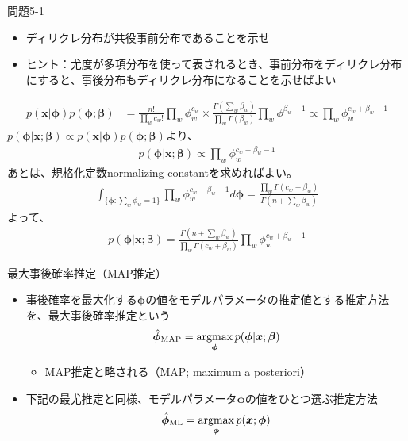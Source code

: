 \documentclass[aspectratio=169,unicode,dvipdfmx,14pt]{beamer}
\begin{document}
\begin{frame}{問題5-1}
\large
\begin{itemize}
\item ディリクレ分布が共役事前分布であることを示せ
\item ヒント：尤度が多項分布を使って表されるとき、事前分布をディリクレ分布にすると、事後分布もディリクレ分布になることを示せばよい
\end{itemize}
\end{frame}

\begin{frame}
\FontMath
\begin{align}
p(\bm{x}|\bm{\phi})p(\bm{\phi};\bm{\beta})
& =
\frac{n!}{\prod_w c_w!} \prod_w \phi_w^{c_w} \times \frac{\Gamma(\sum_w \beta_w)}{\prod_w \Gamma(\beta_w)}\prod_w \phi^{\beta_w - 1}
\propto
\prod_w \phi_w^{c_w + \beta_w - 1}
\end{align}
$p(\bm{\phi}|\bm{x};\bm{\beta}) \propto p(\bm{x}|\bm{\phi})p(\bm{\phi};\bm{\beta})$より、
\begin{align}
p(\bm{\phi} | \bm{x}; \bm{\beta}) \propto \prod_w \phi_w^{c_w + \beta_w - 1}
\end{align}
あとは、規格化定数normalizing constantを求めればよい。
\begin{align}
\int_{\{ \bm{\phi}: \sum_w \phi_w = 1 \}} \prod_w \phi_w^{c_w + \beta_w - 1} d\bm{\phi} 
= \frac{\prod_w \Gamma(c_w+\beta_w)}{\Gamma(n + \sum_w \beta_w)}
\end{align}
よって、
\begin{align}
p(\bm{\phi} | \bm{x}; \bm{\beta}) = \frac{\Gamma(n + \sum_w \beta_w)}{\prod_w \Gamma(c_w+\beta_w)}
\prod_w \phi_w^{c_w + \beta_w - 1}
\end{align}
\end{frame}

\begin{frame}{最大事後確率推定（MAP推定）}
\begin{itemize}
\item 事後確率を最大化する$\bm{\phi}$の値をモデルパラメータの推定値とする推定方法を、最大事後確率推定という
\begin{align}
\hat{\bm{\phi}}_{\mbox{\scriptsize MAP}} = \operatorname*{argmax}_{\bm{\phi}} p(\bm{\phi}|\bm{x};\bm{\beta})
\end{align}
\begin{itemize}
\item MAP推定と略される（MAP; maximum a posteriori）
\end{itemize}
\item 下記の最尤推定と同様、モデルパラメータ$\bm{\phi}$の値をひとつ選ぶ推定方法
\begin{align}
\hat{\bm{\phi}}_{\mbox{\scriptsize ML}} = \operatorname*{argmax}_{\bm{\phi}} p(\bm{x};\bm{\phi})
\end{align}
\end{itemize}
\end{frame}
\end{document}
